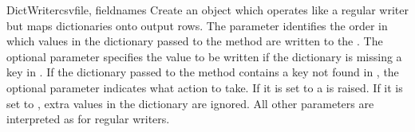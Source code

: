 \begin{classdesc}{DictWriter}{csvfile, fieldnames}
Create an object which operates like a regular writer but maps dictionaries
onto output rows.  The  parameter identifies the order in
which values in the dictionary passed to the  method are
written to the .  The optional  parameter
specifies the value to be written if the dictionary is missing a key in
.  If the dictionary passed to the 
method contains a key not found in , the optional
 parameter indicates what action to take.  If it is set
to  a  is raised.  If it is set to
, extra values in the dictionary are ignored.  All other
parameters are interpreted as for regular writers.
\end{classdesc}



